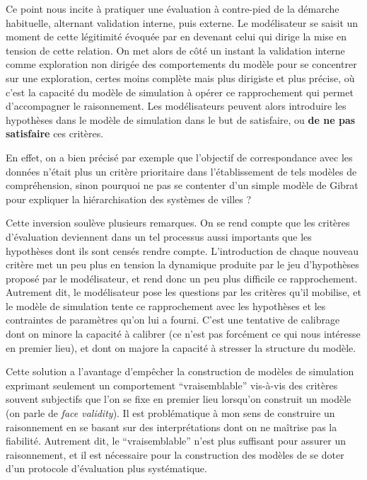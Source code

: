 Ce point nous incite à pratiquer une évaluation à contre-pied de la démarche habituelle, alternant validation interne, puis externe. Le modélisateur se saisit un moment de cette légitimité évoquée par \textcite{Bulle2005} en devenant celui qui dirige la mise en tension de cette relation. On met alors de côté un instant la validation interne comme exploration non dirigée des comportements du modèle pour se concentrer sur une exploration, certes moins complète mais plus dirigiste et plus précise, où c'est la capacité du modèle de simulation à opérer ce rapprochement qui permet d'accompagner le raisonnement. Les modélisateurs peuvent alors introduire les hypothèses dans le modèle de simulation dans le but de satisfaire, ou \textbf{de ne pas satisfaire} ces critères.

En effet, on a bien précisé par exemple que l'objectif de correspondance avec les données n'était plus un critère prioritaire dans l'établissement de tels modèles de compréhension, sinon pourquoi ne pas se contenter d'un simple modèle de Gibrat pour expliquer la hiérarchisation des systèmes de villes ?

Cette inversion soulève plusieurs remarques. On se rend compte que les critères d'évaluation deviennent dans un tel processus aussi importants que les hypothèses dont ils sont censés rendre compte. L'introduction de chaque nouveau critère met un peu plus en tension la dynamique produite par le jeu d'hypothèses proposé par le modélisateur, et rend donc un peu plus difficile ce rapprochement. Autrement dit, le modélisateur pose les questions par les critères qu'il mobilise, et le modèle de simulation tente ce rapprochement avec les hypothèses et les contraintes de paramètres qu'on lui a fourni. C'est une tentative de calibrage dont on minore la capacité à calibrer (ce n'est pas forcément ce qui nous intéresse en premier lieu), et dont on majore la capacité à stresser la structure du modèle.

Cette solution a l'avantage d'empêcher la construction de modèles de simulation exprimant seulement un comportement \enquote{vraisemblable} vis-à-vis des critères souvent subjectifs que l'on se fixe en premier lieu lorsqu'on construit un modèle (on parle de \textit{face validity}). Il est problématique à mon sens de construire un raisonnement en se basant sur des interprétations dont on ne maîtrise pas la fiabilité. Autrement dit, le \enquote{vraisemblable} n'est plus suffisant pour assurer un raisonnement, et il est nécessaire pour la construction des modèles de se doter d'un protocole d'évaluation plus systématique.

